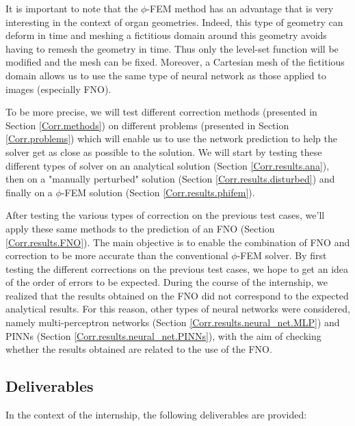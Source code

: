 It is important to note that the $\phi$-FEM method has an advantage that is very interesting in the context of organ geometries. Indeed, this type of geometry can deform in time and meshing a fictitious domain around this geometry avoids having to remesh the geometry in time. Thus only the level-set function will be modified and the mesh can be fixed. Moreover, a Cartesian mesh of the fictitious domain allows us to use the same type of neural network as those applied to images (especially FNO).

To be more precise, we will test different correction methods (presented in Section \ref{Corr.methods}) on different problems (presented in Section \ref{Corr.problems}) which will enable us to use the network prediction to help the solver get as close as possible to the solution. We will start by testing these different types of solver on an analytical solution (Section \ref{Corr.results.ana}), then on a "manually perturbed" solution (Section \ref{Corr.results.disturbed}) and finally on a $\phi$-FEM solution (Section \ref{Corr.results.phifem}).

After testing the various types of correction on the previous test cases, we'll apply these same methods to the prediction of an FNO (Section \ref{Corr.results.FNO}). The main objective is to enable the combination of FNO and correction to be more accurate than the conventional $\phi$-FEM solver. By first testing the different corrections on the previous test cases, we hope to get an idea of the order of errors to be expected. During the course of the internship, we realized that the results obtained on the FNO did not correspond to the expected analytical results. For this reason, other types of neural networks were considered, namely multi-perceptron networks (Section \ref{Corr.results.neural_net.MLP}) and PINNs (Section \ref{Corr.results.neural_net.PINNs}), with the aim of checking whether the results obtained are related to the use of the FNO.

\subsection{Deliverables}

In the context of the internship, the following deliverables are provided:

